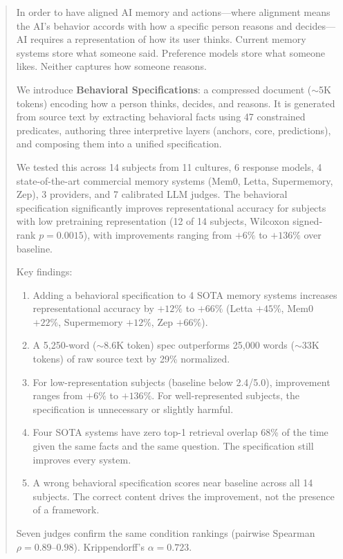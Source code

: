\documentclass[11pt,a4paper]{article}
\begin{document}
\begin{abstract}
In order to have aligned AI memory and actions---where alignment means the AI's behavior
accords with how a specific person reasons and decides---AI requires a representation of how
its user thinks. Current memory systems store what someone said. Preference models store what
someone likes. Neither captures how someone reasons.

We introduce \textbf{Behavioral Specifications}: a compressed document ($\sim$5K tokens)
encoding how a person thinks, decides, and reasons. It is generated from source text by
extracting behavioral facts using 47 constrained predicates, authoring three interpretive
layers (anchors, core, predictions), and composing them into a unified specification.

We tested this across 14 subjects from 11 cultures, 6 response models, 4 state-of-the-art
commercial memory systems (Mem0, Letta, Supermemory, Zep), 3 providers, and 7 calibrated
LLM judges. The behavioral specification significantly improves representational accuracy
for subjects with low pretraining representation (12 of 14 subjects, Wilcoxon signed-rank
$p=0.0015$), with improvements ranging from $+6\%$ to $+136\%$ over baseline.

\vspace{0.5em}
\noindent Key findings:

\begin{enumerate}
\item Adding a behavioral specification to 4 SOTA memory systems increases representational
accuracy by $+12\%$ to $+66\%$ (Letta $+45\%$, Mem0 $+22\%$, Supermemory $+12\%$, Zep $+66\%$).

\item A 5,250-word ($\sim$8.6K token) spec outperforms 25,000 words ($\sim$33K tokens) of raw
source text by 29\% normalized.

\item For low-representation subjects (baseline below 2.4/5.0), improvement ranges from
$+6\%$ to $+136\%$. For well-represented subjects, the specification is unnecessary or
slightly harmful.

\item Four SOTA systems have zero top-1 retrieval overlap 68\% of the time given the same
facts and the same question. The specification still improves every system.

\item A wrong behavioral specification scores near baseline across all 14 subjects. The
correct content drives the improvement, not the presence of a framework.
\end{enumerate}

\noindent Seven judges confirm the same condition rankings (pairwise Spearman
$\rho = 0.89$--$0.98$). Krippendorff's $\alpha = 0.723$.
\end{abstract}
\end{document}
